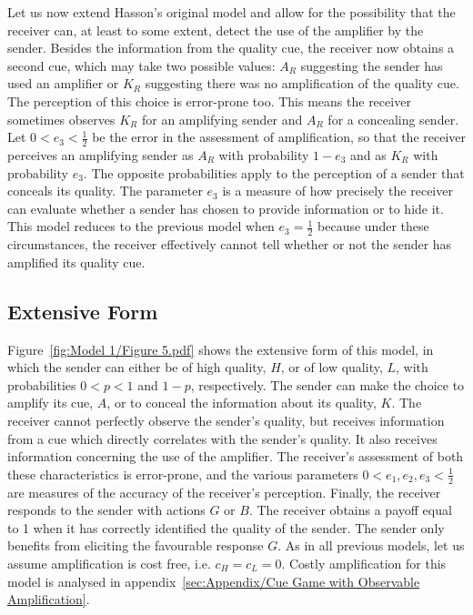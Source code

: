 \documentclass[a4paper,12pt]{article}
\numberwithin{equation}{section}
\begin{document}
Let us now extend Hasson's original model and allow for the possibility that the receiver can, at least to some extent, detect the use of the amplifier by the sender. Besides the information from the quality cue, the receiver now obtains a second cue, which may take two possible values: $A_{R}$ suggesting the sender has used an amplifier or $K_{R}$ suggesting there was no amplification of the quality cue. The perception of this choice is error-prone too. This means the receiver sometimes observes $K_{R}$ for an amplifying sender and $A_{R}$ for a concealing sender. Let $0<e_{3}<\frac{1}{2}$ be the error in the assessment of amplification, so that the receiver perceives an amplifying sender as $A_{R}$ with probability $1-e_{3}$ and as $K_{R}$ with probability $e_{3}$. The opposite probabilities apply to the perception of a sender that conceals its quality. The parameter $e_{3}$ is a measure of how precisely the receiver can evaluate whether a sender has chosen to provide information or to hide it. This model reduces to the previous model when $e_{3} = \frac{1}{2}$ because under these circumstances, the receiver effectively cannot tell whether or not the sender has amplified its quality cue.


\subsection{Extensive Form}
\label{sec:Cue Game with Observable Amplification/Extensive Form}

Figure~\ref{fig:Model 1/Figure 5.pdf} shows the extensive form of this model, in which the sender can either be of high quality, $H$, or of low quality, $L$, with probabilities $0<p<1$ and $1-p$, respectively. The sender can make the choice to amplify its cue, $A$, or to conceal the information about its quality, $K$. The receiver cannot perfectly observe the sender's quality, but receives information from a cue which directly correlates with the sender's quality. It also receives information concerning the use of the amplifier. The receiver's assessment of both these characteristics is error-prone, and the various parameters $0<e_{1},e_{2},e_{3}<\frac{1}{2}$ are measures of the accuracy of the receiver's perception. Finally, the receiver responds to the sender with actions $G$ or $B$. The receiver obtains a payoff equal to 1 when it has correctly identified the quality of the sender. The sender only benefits from eliciting the favourable response $G$. As in all previous models, let us assume amplification is cost free, i.e. $c_{H} = c_{L} = 0$. Costly amplification for this model is analysed in appendix~\ref{sec:Appendix/Cue Game with Observable Amplification}.
\end{document}
